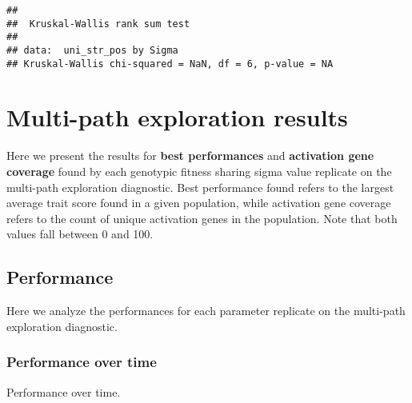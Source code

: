 \documentclass[]{book}
\newenvironment{Shaded}{\begin{snugshade}}{\end{snugshade}}
\newcommand{\DataTypeTok}[1]{\textcolor[rgb]{0.13,0.29,0.53}{#1}}
\newcommand{\KeywordTok}[1]{\textcolor[rgb]{0.13,0.29,0.53}{\textbf{#1}}}
\newcommand{\NormalTok}[1]{#1}
\newcommand{\OperatorTok}[1]{\textcolor[rgb]{0.81,0.36,0.00}{\textbf{#1}}}
\newcommand{\StringTok}[1]{\textcolor[rgb]{0.31,0.60,0.02}{#1}}
\begin{document}
\begin{verbatim}
## 
##  Kruskal-Wallis rank sum test
## 
## data:  uni_str_pos by Sigma
## Kruskal-Wallis chi-squared = NaN, df = 6, p-value = NA
\end{verbatim}

\hypertarget{multi-path-exploration-results-3}{%
\section{Multi-path exploration results}\label{multi-path-exploration-results-3}}

Here we present the results for \textbf{best performances} and \textbf{activation gene coverage} found by each genotypic fitness sharing sigma value replicate on the multi-path exploration diagnostic.
Best performance found refers to the largest average trait score found in a given population, while activation gene coverage refers to the count of unique activation genes in the population.
Note that both values fall between 0 and 100.

\hypertarget{performance-6}{%
\subsection{Performance}\label{performance-6}}

Here we analyze the performances for each parameter replicate on the multi-path exploration diagnostic.

\hypertarget{performance-over-time-12}{%
\subsubsection{Performance over time}\label{performance-over-time-12}}

Performance over time.

\begin{Shaded}
\end{Shaded}
\end{document}

